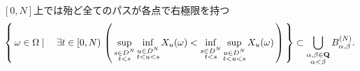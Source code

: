  	\begin{itembox}[l]{$[0,N]$上では殆ど全てのパスが各点で右極限を持つ}
 		\begin{align}
 			\left\{\, \omega \in \Omega \mid \quad \exists t \in [0,N)\, \left(\, 
 			\operatorname*{sup}_{\substack{s \in D^N \\ t < s}} \operatorname*{inf}_{\substack{u \in D^N \\ t < u < s}} X_u(\omega) 
 			< \operatorname*{inf}_{\substack{s \in D^N \\ t < s}} \operatorname*{sup}_{\substack{u \in D^N \\ t < u < s}} X_u(\omega)\, \right)\, \right\}
 			\subset \bigcup_{\substack{\alpha,\beta \in \mathbf{Q} \\ \alpha < \beta}} B_{\alpha,\beta}^{(N)}.
 		\end{align}
 	\end{itembox}
 	
